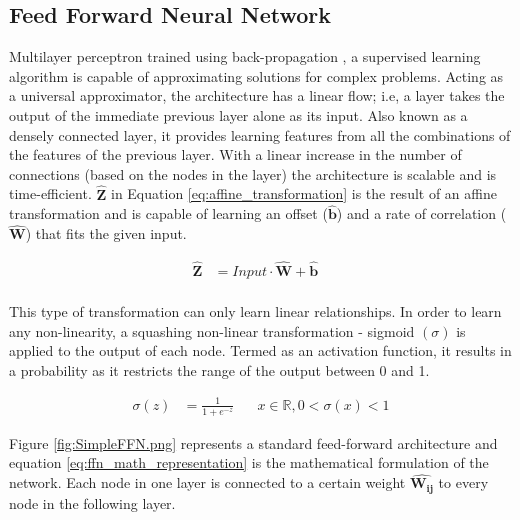 \documentclass{article}
\let\oldhat\hat
\renewcommand{\hat}[1]{\oldhat{\mathbf{#1}}}
\begin{document}
\subsection{Feed Forward Neural Network}
\label{sssec:ffn}
Multilayer perceptron trained using back-propagation \cite{Rumelhart1986LearningIR}, a supervised learning algorithm is capable of approximating solutions for complex problems. Acting as a universal approximator, the architecture has a linear flow; i.e, a layer takes the output of the immediate previous layer alone as its input. Also known as a densely connected layer, it provides learning features from all the combinations of the features of the previous layer. With a linear increase in the number of connections (based on the nodes in the layer) the architecture is scalable and is time-efficient. $\hat{Z}$ in Equation \ref{eq:affine_transformation} is the result of an affine transformation and is capable of learning an offset ($\hat{b}$) and a rate of correlation ($\hat{W}$) that fits the given input.

\begin{equation}
\label{eq:affine_transformation}
\begin{aligned}
\hat{Z} &= Input \cdot \hat{W} + \hat{b}&\\
\end{aligned}
\end{equation}

This type of transformation can only learn linear relationships. In order to learn any non-linearity, a squashing non-linear transformation - sigmoid $(\sigma)$ \cite{Han1995TheIO} is applied to the output of each node. Termed as an activation function, it results in a probability as it restricts the range of the output between 0 and 1.

\begin{equation}
\label{eq:sigmoid_activation}
\begin{aligned}
\sigma(z) &= \frac{1}{1+e^{-z}} \;\;\;\;\;\;  x\in\mathbb{R}, 0<\sigma(x)<1
\end{aligned}
\end{equation}

Figure \ref{fig:SimpleFFN.png} represents a standard feed-forward architecture and equation \ref{eq:ffn_math_representation} is the mathematical formulation of the network. Each node in one layer is connected to a certain weight $\hat{W_{ij}}$ to every node in the following layer. 
\end{document}
